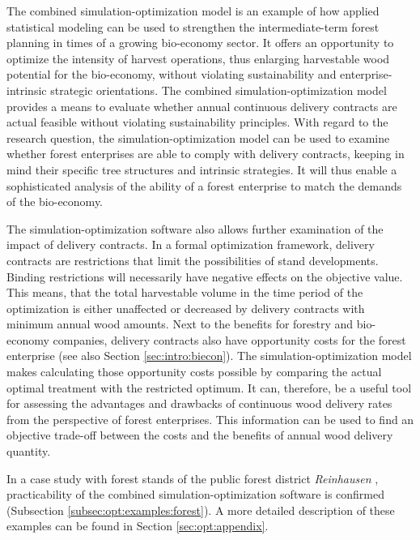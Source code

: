 The combined simulation-optimization model is an example of how applied statistical modeling can be used to strengthen the intermediate-term forest planning in times of a growing bio-economy sector. It offers an opportunity to optimize the intensity of harvest operations, thus enlarging harvestable wood potential for the bio-economy, without violating sustainability and enterprise-intrinsic strategic orientations. The combined si\-mu\-la\-tion-op\-ti\-mi\-za\-tion model provides a means to evaluate whether annual continuous delivery contracts are actual feasible without violating sustainability principles. With regard to the research question, the si\-mu\-la\-tion-op\-ti\-mi\-za\-tion model can be used to examine whether forest enterprises are able to comply with delivery contracts, keeping in mind their specific tree structures and intrinsic strategies. It will thus enable a sophisticated analysis of the ability of a forest enterprise to match the demands of the bio-economy. 

The simulation-optimization software also allows further examination of the impact of delivery contracts. In a formal optimization framework, delivery contracts are restrictions that limit the possibilities of stand developments. Binding restrictions will necessarily have negative effects on the objective value. This means, that the total harvestable volume in the time period of the optimization is either unaffected or decreased by delivery contracts with minimum annual wood amounts. Next to the benefits for forestry and bio-economy companies, delivery contracts also have opportunity costs for the forest enterprise (see also Section \ref{sec:intro:biecon}). The si\-mu\-la\-tion-op\-ti\-mi\-za\-tion model makes calculating those opportunity costs possible by comparing the actual optimal treatment with the restricted optimum. It can, therefore, be a useful tool for assessing the advantages and drawbacks of continuous wood delivery rates from the perspective of forest enterprises. This information can be used to find an objective trade-off between the costs and the benefits of annual wood delivery quantity.

In a case study with forest stands of the public forest district \textit{Reinhausen} \citep{nlf_2017}, practicability of the combined si\-mu\-la\-tion-op\-ti\-mi\-za\-tion software is confirmed (Subsection \ref{subsec:opt:examples:forest}). A more detailed description of these examples can be found in Section \ref{sec:opt:appendix}.
